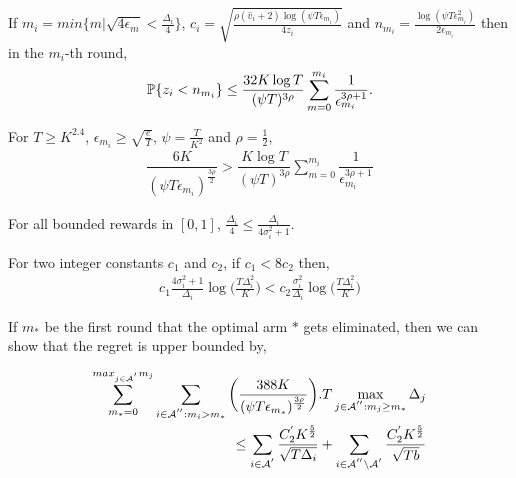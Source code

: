 \begin{lemma}
\label{proofTheorem:Lemma:5}
If $m_i = min\lbrace m|\sqrt{4\epsilon_{m} } < \frac{\Delta_i}{4} \rbrace $, $c_{i} =\sqrt{\frac{\rho (\hat{v}_i + 2)\log (\psi T\epsilon_{m_{i}})}{4 z_i}}$ and $n_{m_i}=\frac{\log{(\psi T\epsilon_{m_{i}}^{2})}}{2\epsilon_{m_{i}}}$ then in the $m_i$-th round, 
\begin{align*}
\mathbb{P}\lbrace z_i < n_{m_i} \rbrace \leq \dfrac{32K\log T}{(\psi T)^{3\rho}}\sum_{m=0}^{m_i}\dfrac{1}{\epsilon_{m_i}^{3\rho + 1}}.
\end{align*}
\end{lemma}



\begin{lemma}
\label{proofTheorem:Lemma:6}
For $T\geq K^{2.4}$, $\epsilon_{m_i}\geq \sqrt{\frac{e}{T}}$, $\psi=\frac{T}{K^2}$ and $\rho=\frac{1}{2}$,  
\begin{align*}
\dfrac{6K}{(\psi T \epsilon_{m_i})^{\frac{3\rho}{2}}} > \dfrac{K\log T}{(\psi T)^{3\rho}}\sum_{m=0}^{m_i}\dfrac{1}{\epsilon_{m_i}^{3\rho + 1}}
\end{align*}
\end{lemma}



\begin{lemma}
\label{proofTheorem:Lemma:7}
For all bounded rewards in $[0,1]$, $\frac{\Delta_i}{4} \leq \frac{\Delta_i}{4\sigma_i^2 + 1} $.
\end{lemma}



\begin{lemma}
\label{proofTheorem:Lemma:8}
For two integer constants $c_1$ and $c_2$, if $c_1 < 8 c_2$ then,
\begin{align*}
c_1 \frac{4\sigma_i^2 + 1}{\Delta_i}\log\bigg( \frac{T\Delta_i^2}{K}\bigg) < c_2 \frac{\sigma_i^2}{\Delta_i}\log\bigg( \frac{T\Delta_i^2}{K}\bigg)
\end{align*}
\end{lemma}


\begin{lemma}
\label{proofTheorem:Lemma:9}
If $m_*$ be the first round that the optimal arm $*$ gets eliminated, then we can show that the regret is upper bounded by,

\begin{align*}
\sum_{m_{*}=0}^{max_{j\in \mathcal{A}^{'}}m_{j}}\sum_{i\in \mathcal{A}^{''}:m_{i}>m_{*}}\bigg(\dfrac{388 K}{(\psi  T\epsilon_{m_{*}})^{\frac{3\rho}{2}}} \bigg).T\max_{j\in \mathcal{A}^{''}:m_{j}\geq m_{*}}{\Delta}_{j} \\
 \leq\sum_{i\in \mathcal{A}^{'}}\dfrac{C_2^{'} K^{\frac{5}{2}}}{\sqrt{T\Delta_i}} +\sum_{i\in \mathcal{A}^{''}\setminus \mathcal{A}^{'}}\dfrac{C_2^{'} K^{\frac{5}{2}}}{\sqrt{T b}}
\end{align*}

\end{lemma}


